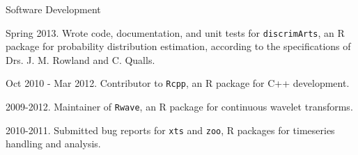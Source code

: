 \documentclass{resume} %
\begin{document}
\begin{rSection}{Software Development}
\item Spring 2013. Wrote code, documentation, and unit tests for \texttt{discrimArts}, an R package for probability
distribution estimation, according to the specifications of Drs. J. M. Rowland and C. Qualls.
\item Oct 2010 - Mar 2012. Contributor to \texttt{Rcpp},  an R package for C++ development.
\item 2009-2012. Maintainer of \texttt{Rwave}, an R package for continuous
wavelet transforms.
\item 2010-2011. Submitted bug reports for \texttt{xts} and \texttt{zoo}, R
packages for timeseries handling and analysis.
\end{rSection}




\end{document}
